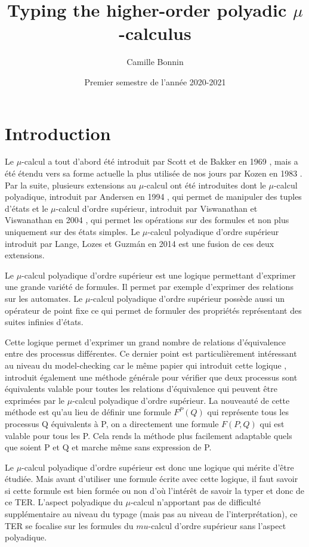 \documentclass{rapport}
\title{Typing the higher-order polyadic $\mu$-calculus}
\author{Camille Bonnin}
\date{Premier semestre de l'année 2020-2021}
\theoremstyle{plain}
\theoremstyle{remark}
\theoremstyle{definition}
\begin{document}
\maketitle

\tableofcontents
\newpage

\section{Introduction\label{intro}}

Le $\mu$-calcul a tout d'abord été introduit par Scott et de Bakker en 1969 \citep{scott1969theory}, mais a été étendu vers sa forme actuelle la plus utilisée de nos jours par Kozen en 1983 \citep{kozen1983results}. Par la suite, plusieurs extensions au 
$\mu$-calcul ont été introduites dont le $\mu$-calcul polyadique, introduit par Andersen en 1994 \citep{andersen1994polyadic}, qui permet de manipuler des tuples d'états et le $\mu$-calcul d'ordre supérieur, introduit par Viswanathan et Viswanathan en 2004 \citep{viswanathan2004higher}, qui permet les opérations sur des formules et non plus uniquement sur des états simples. Le $\mu$-calcul polyadique d'ordre supérieur introduit par Lange, Lozes et Guzm{\'a}n en 2014 \citep{lange2014model} est une fusion de ces deux extensions.

Le $\mu$-calcul polyadique d'ordre supérieur est une logique permettant d'exprimer une grande variété de formules. Il permet par exemple d'exprimer des relations sur les automates. Le $\mu$-calcul polyadique d'ordre supérieur possède aussi un opérateur de point fixe ce qui permet de formuler des propriétés représentant des suites infinies d'états. 

Cette logique permet d'exprimer un grand nombre de relations d'équivalence entre des processus différentes. Ce dernier point est particulièrement intéressant au niveau du model-checking car le même papier qui introduit cette logique \citep{lange2014model}, introduit également une méthode générale pour vérifier que deux processus sont équivalents valable pour toutes les relations d'équivalence qui peuvent être exprimées par le $\mu$-calcul polyadique d'ordre supérieur. La nouveauté de cette méthode est qu'au lieu de définir une formule $F^P(Q)$ qui représente tous les processus Q équivalents à P, on a directement une formule $F(P, Q)$ qui est valable pour tous les P. Cela rends la méthode plus facilement adaptable quels que soient P et Q et marche même sans expression de P. 

Le $\mu$-calcul polyadique d'ordre supérieur est donc une logique qui mérite d'être étudiée. Mais avant d'utiliser une formule écrite avec cette logique, il faut savoir si cette formule est bien formée ou non d'où l'intérêt de savoir la typer et donc de ce TER. L'aspect polyadique du $\mu$-calcul n'apportant pas de difficulté supplémentaire au niveau du typage (mais pas au niveau de l'interprétation), ce TER se focalise sur les formules du $mu$-calcul d'ordre supérieur sans l'aspect polyadique. 
\end{document}
